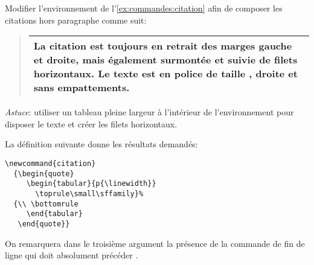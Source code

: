 \begin{exercice}
  Modifier l'environnement  de
  l'\autoref{ex:commandes:citation} afin de composer les citations
  hors paragraphe comme suit:
  \begin{quote}
    \begin{tabular}{p{\linewidth}}
      \toprule
      \small\sffamily%
      La citation est toujours en retrait des marges gauche et droite,
      mais également surmontée et suivie de filets horizontaux. Le
      texte est en police de taille \cmdprint{\small}, droite et sans
      empattements. \\
      \bottomrule
    \end{tabular}
  \end{quote}
  \emph{Astuce}: utiliser un tableau pleine largeur à l'intérieur de
  l'environnement  pour disposer le texte et créer les
  filets horizontaux.
  \begin{sol}
    La définition suivante donne les résultats demandés:
\begin{lstlisting}
\newcommand{citation}
  {\begin{quote}
     \begin{tabular}{p{\linewidth}}
       \toprule\small\sffamily}%
  {\\ \bottomrule
     \end{tabular}
   \end{quote}}
\end{lstlisting}
    On remarquera dans le troisième argument la présence de la
    commande de fin de ligne {\bs\bs} qui doit absolument précéder
    \cmdprint{\bottomrule}.
  \end{sol}
\end{exercice}


